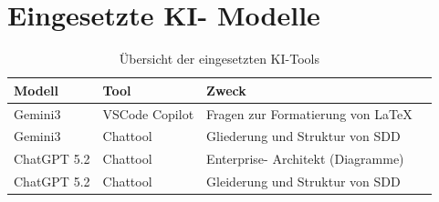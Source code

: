
\section*{Eingesetzte KI- Modelle}
\begin{table}[H]
    \centering
    \caption{Übersicht der eingesetzten KI-Tools}
    \label{tab:ki_uebersicht}
    \begin{tabular}{@{} p{3.5cm} p{4cm} p{3.5cm} p{3cm} @{}}
        \toprule
        \textbf{Modell} & \textbf{Tool} & \textbf{Zweck} \\ 
        \midrule
        Gemini3     & VSCode Copilot & Fragen zur Formatierung von LaTeX \\
        Gemini3     & Chattool & Gliederung und Struktur von \ac{SDD}    \\
        ChatGPT 5.2 & Chattool & Enterprise- Architekt (Diagramme) \\
        ChatGPT 5.2 & Chattool & Gleiderung und Struktur von \ac{SDD} \\
        \bottomrule
    \end{tabular}
\end{table}
